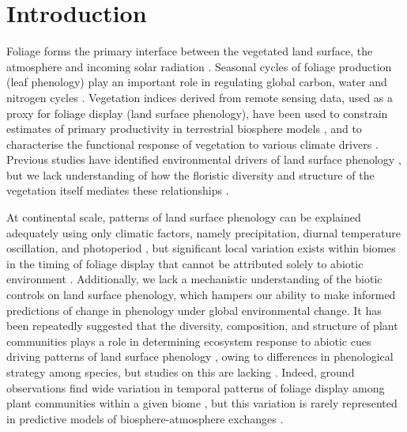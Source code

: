 \documentclass[11pt,a4paper]{article}
\begin{document}
\newpage{}

\section{Introduction}

Foliage forms the primary interface between the vegetated land surface, the
atmosphere and incoming solar radiation \citep{Gu2003, Penuelas2009}. Seasonal
cycles of foliage production (leaf phenology) play an important role in
regulating global carbon, water and nitrogen cycles \citep{Garonna2016}.
Vegetation indices derived from remote sensing data, used as a proxy for
foliage display (land surface phenology), have been used to constrain estimates
of primary productivity in terrestrial biosphere models \citep{Bloom2016,
Helman2018}, and to characterise the functional response of vegetation to
various climate drivers \citep{Richardson2013}. Previous studies have
identified environmental drivers of land surface phenology \citep{Adole2019,
Guan2014}, but we lack understanding of how the floristic diversity and
structure of the vegetation itself mediates these relationships
\citep{Whitley2017, Pau2011}. 

At continental scale, patterns of land surface phenology can be explained
adequately using only climatic factors, namely precipitation, diurnal
temperature oscillation, and photoperiod \citep{Adole2018b, Adole2019,
Guan2014}, but significant local variation exists within biomes in the timing
of foliage display that cannot be attributed solely to abiotic environment
\citep{Stockli2011}. Additionally, we lack a mechanistic understanding of the
biotic controls on land surface phenology, which hampers our ability to make
informed predictions of change in phenology under global environmental change.
It has been repeatedly suggested that the diversity, composition, and structure
of plant communities plays a role in determining ecosystem response to abiotic
cues driving patterns of land surface phenology \citep{Adole2018a,
Jeganathan2014, Fuller1999}, owing to differences in phenological strategy
among species, but studies on this are lacking \citep{Ma2022}. Indeed, ground
observations find wide variation in temporal patterns of foliage display among
plant communities within a given biome \citep{Seyednasrollah2019}, but this
variation is rarely represented in predictive models of biosphere-atmosphere
exchanges \citep{Scheiter2013, Pavlick2013}.
\end{document}
